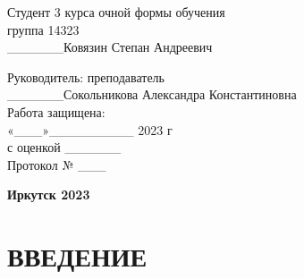 \documentclass[12pt, oldlfont, amsfonts]{report}
\begin{document}
   \hspace{-5em} 



\begin{minipage}[t]{0.5\textwidth}
  \begin{flushleft}
  
		\end{flushleft}
\end{minipage}\hspace{1em} 
\begin{minipage}[t]{0.5\textwidth}
  \begin{flushleft}
  \linespread{1}
	\small{
    Студент 3 курса
	очной формы обучения \\
  группа 14323\\
	\_\_\_\_\_\_Ковязин Степан Андреевич\\
	\vspace{2em}
		
	Руководитель: преподаватель\\
		\_\_\_\_\_\_Сокольникова Александра Константиновна\\
\vspace{2em}
 Работа защищена:\\
	«\_\_\_»\_\_\_\_\_\_\_\_\_ 2023 г \\
 с оценкой \_\_\_\_\_\_\\
Протокол № \_\_\_}
		
		
		\end{flushleft}
\end{minipage}

    \vspace{\fill}
\vspace{1em}
    \begin{center}
   {\bf Иркутск 2023  }
    \end{center}
\newpage

\pagestyle{plain}%

\newpage
\setcounter{page}{2} 
\newpage

\tableofcontents %


\setcounter{chapter}{0}
\setcounter{subsection}{0}
\setcounter{equation}{0}
\setcounter{section}{0}

\chapter*{\large{{\centering ВВЕДЕНИЕ}}}
\end{document}
